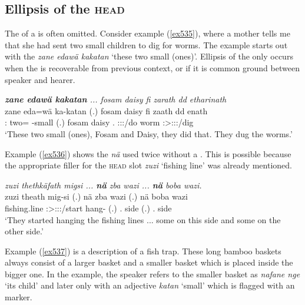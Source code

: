 \subsection{Ellipsis of the \textsc{head}}\label{headellipsis}

The  of a  is often omitted. Consider example (\ref{ex535}), where a mother tells me that she had sent two small children to dig for worms. The example starts out with the  \emph{zane edawä kakatan} `these two small (ones)'. Ellipsis of the  only occurs when the  is recoverable from previous context, or if it is common ground between speaker and hearer.

\begin{exe}
	\ex \emph{\textbf{zane edawä kakatan} ... fosam daisy fi zarath dd etharinath}\\
	\gll zane eda=wä ka-katan (.) fosam daisy fi zaath dd enath\\
	\Dem:\Prox{} two=\Emph{} \Redup-small (.) fosam daisy \Third.\Abs{} \Stdu:\Sbj:\Pst:\Pfv/do worm \Stdu:\Sbj>\Stpl:\Obj:\Pst:\Ipfv/dig\\
	\trans `These two small (ones), Fosam and Daisy, they did that. They dug the worms.'
	\label{ex535}
\end{exe}

Example (\ref{ex536}) shows the   \emph{nä} used twice without a . This is possible because the appropriate filler for the \textsc{head} slot \emph{zuzi} `fishing line' was already mentioned.

\begin{exe}
 	\ex \emph{zuzi thethkäfath migsi ... \textbf{nä} zba wazi ... \textbf{nä} boba wazi.}\\
 	\gll zuzi theath mig-si (.) nä zba wazi (.) nä boba wazi\\
	{fishing.line} \Stpl:\Sbj>\Stpl:\Obj:\Pst:\Pfv/start hang-\Nmlz{} (.) \Indf{} \Prox.\Abl{} side (.) \Indf{} \Med.\Abl{} side\\
 	\trans `They started hanging the fishing lines ... some on this side and some on the other side.'
 	\label{ex536}
\end{exe}

Example (\ref{ex537}) is a description of a fish trap. These long bamboo baskets always consist of a larger basket and a smaller basket which is placed inside the bigger one. In the example, the speaker refers to the smaller basket as \emph{nafane nge} `its child' and later only with an adjective \emph{katan} `small' which is flagged with an   marker.

